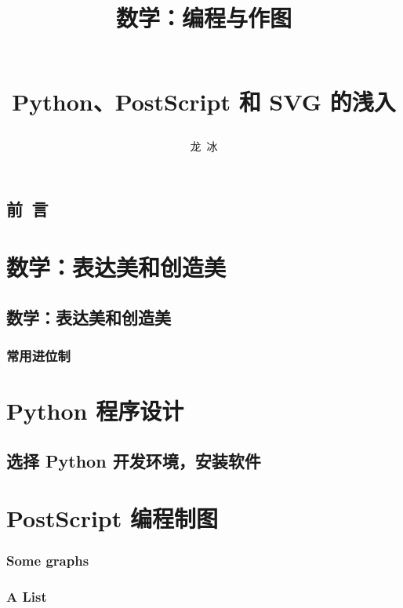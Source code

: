 \documentclass[zihao=-4,heading=true,a4paper,twoside,openany]{ctexbook}
\title{\begin{kaishu}数学：编程与作图\end{kaishu}\\
	Python、PostScript 和 SVG 的浅入}
\author{\kaishu 龙\,  冰}
\date{}
\begin{document}
\begin{titlepage}
	\maketitle
\end{titlepage}
\chapter*{\kaishu 前\, 言}%


\tableofcontents

\part{数学：表达美和创造美}\label{part:表达美和创造美}
\chapter{数学：表达美和创造美}%




\section{常用进位制}\label{sec:I.2}


\part{Python 程序设计}
\chapter{选择 Python 开发环境，安装软件}\label{sec:II.2}




\newpage\part{PostScript 编程制图}
\section{Some graphs}


\section{A List}


\printindex
\printbibliography
\end{document}
